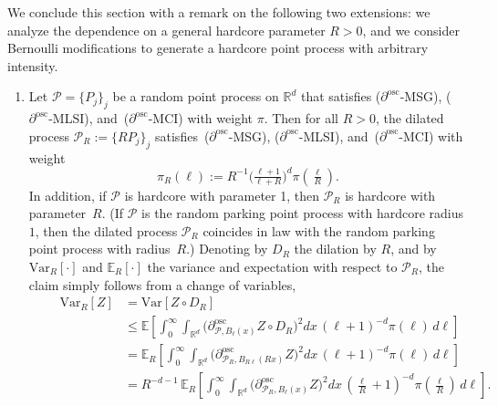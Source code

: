\documentclass[AHL,Unicode,longabstracts]{cedram}
\newcommand{\R}{\mathbb R}
\newcommand{\expecR}[1]{\mathbb{E}_R\left[#1 \right]}
\newcommand{\expec}[1]{\mathbb{E}\left[#1 \right]}
\newcommand{\Pc}{\mathcal P}
\newcommand{\osc}{\partial^{\mathrm{osc}}}
\newcommand{\oscd}[1]{\mathrel{\osc_{#1}}}
\newcommand{\var}[1]{\mathrm{Var}\left[#1\right]}
\newcommand{\varR}[1]{\mathrm{Var}_R\left[#1\right]}
\newcommand*{\alphenumi}{\renewcommand*{\theenumi}{\alph{enumi}}}
\begin{document}
\begin{rema}\label{lem:general-hardcore/decimated}
We conclude this section with a remark on the following two extensions: we analyze the dependence on a general hardcore parameter $R>0$, and we consider Bernoulli modifications to generate a hardcore point process with arbitrary intensity.
\begin{enumerate}\alphenumi
\item \label{rema3.4.1} Let $\Pc=\{P_j\}_j$ be a random point process on $\R^d$ that satisfies {($\osc$-MSG)}, {($\osc$-MLSI)}, and~{($\osc$-MCI)} with weight $\pi$. Then for all $R>0$, the dilated process $\Pc_R:=\{RP_j\}_j$ satisfies~{($\osc$-MSG)}, {($\osc$-MLSI)}, and~{($\osc$-MCI)} with weight
\[
\pi_R(\ell):= R^{-1} \big(\tfrac{\ell+1} {\ell+ R}\big)^{d}\pi(\tfrac \ell R).
\]
In addition, if $\Pc$ is hardcore with parameter 1, then $\Pc_R$ is hardcore with parameter~$R$. (If $\Pc$ is the random parking point process with hardcore radius $1$, then the dilated process $\Pc_R$ coincides in law with the random parking point process with radius~$R$.) Denoting by $D_R$ the dilation by $R$, and by $\varR{\cdot}$ and $\expecR{\cdot}$ the variance and expectation with respect to $\Pc_R$, the claim simply follows from a change of variables,
\begin{align*}
\qquad\varR{Z}&=\var{Z\circ D_R}\\
&\le \expec{\int_0^\infty\int_{\R^d} \Big(\oscd{\Pc,B_\ell(x)}Z\circ D_R\Big)^2dx\,(\ell+1)^{-d} \pi(\ell)\,d\ell}
\\
&=\expecR{\int_0^\infty\int_{\R^d} \Big(\oscd{\Pc_R,B_{R\ell}(Rx)}Z\Big)^2dx\, (\ell+1)^{-d} \pi(\ell)\,d\ell}
\\
&=R^{-d-1}\,\expecR{\int_0^\infty\int_{\R^d} \Big(\oscd{\Pc_R,B_{\ell}(x)}Z\Big)^2dx\, (\tfrac\ell R+1)^{-d} \pi(\tfrac\ell R)\,d\ell}.
\end{align*}


\end{enumerate}
\end{rema}
\end{document}
